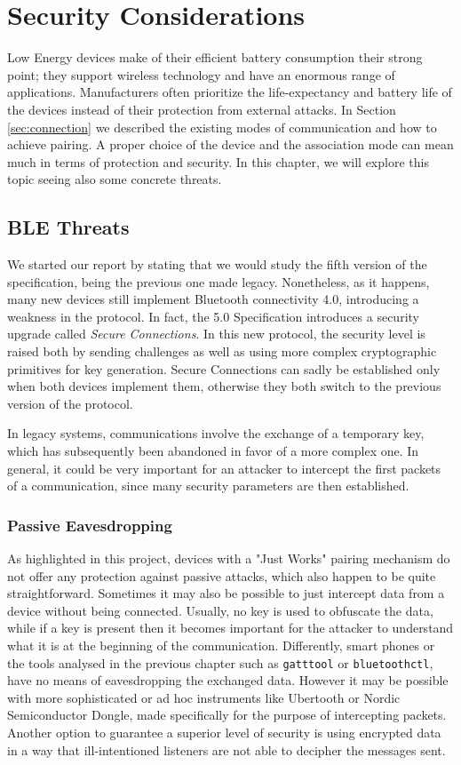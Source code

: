 \chapter{Security Considerations}
\label{chapter4}
\thispagestyle{empty}

\noindent Low Energy devices make of their efficient battery consumption their strong point; they support wireless technology and have an enormous range of applications. Manufacturers often prioritize the life-expectancy and battery life of the devices instead of their protection from external attacks. In Section \ref{sec:connection} we described the existing modes of communication and how to achieve pairing. A proper choice of the device and the association mode can mean much in terms of protection and security. In this chapter, we will explore this topic seeing also some concrete threats.

\section{BLE Threats}
We started our report by stating that we would study the fifth version of the specification, being the previous one made legacy. Nonetheless, as it happens, many new devices still implement Bluetooth connectivity 4.0, introducing a weakness in the protocol. In fact, the 5.0 Specification introduces a security upgrade called \textit{Secure Connections}. In this new protocol, the security level is raised both by sending challenges as well as using more complex cryptographic primitives for key generation. Secure Connections can sadly be established only when both devices implement them, otherwise they both switch to the previous version of the protocol.

In legacy systems, communications involve the exchange of a temporary key, which has subsequently been abandoned in favor of a more complex one. In general, it could be very important for an attacker to intercept the first packets of a communication, since many security parameters are then established. 
\subsection{Passive Eavesdropping}
As highlighted in this project, devices with a "Just Works" pairing mechanism do not offer any protection against passive attacks, which also happen to be quite straightforward. Sometimes it may also be possible to just intercept data from a device without being connected. Usually, no key is used to obfuscate the data, while if a key is present then it becomes important for the attacker to understand what it is at the beginning of the communication.
Differently, smart phones or  the tools analysed in the previous chapter such as \texttt{gatttool} or \texttt{bluetoothctl}, have no means of eavesdropping the exchanged data. However it may be possible with more sophisticated or ad hoc instruments like Ubertooth or Nordic Semiconductor Dongle, made specifically for the purpose of intercepting packets.
Another option to guarantee a superior level of security is using encrypted data in a way that ill-intentioned listeners are not able to decipher the messages sent.

